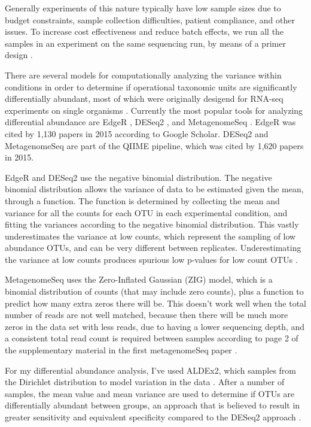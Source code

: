 Generally experiments of this nature typically have low sample sizes due to budget constraints, sample collection difficulties, patient compliance, and other issues. To increase cost effectiveness and reduce batch effects, we run all the samples in an experiment on the same sequencing run, by means of a primer design \cite{gloor2010microbiome}.

There are several models for computationally analyzing the variance within conditions in order to determine if operational taxonomic units are significantly differentially abundant, most of which were originally desigend for RNA-seq experiments on single organisms \cite{pachter2011models}. Currently the most popular tools for analyzing differential abundance are EdgeR \cite{robinson2010edger}, DESeq2 \cite{love2014moderated}, and MetagenomeSeq \cite{paulson2014metagenomeseq}. EdgeR was cited by 1,130 papers in 2015 according to Google Scholar. DESeq2 and MetagenomeSeq are part of the QIIME pipeline, which was cited by 1,620 papers in 2015.

EdgeR and DESeq2 use the negative binomial distribution. The negative binomial distribution allows the variance of data to be estimated given the mean, through a function. The function is determined by collecting the mean and variance for all the counts for each OTU in each experimental condition, and fitting the variances according to the negative binomial distribution. This vastly underestimates the variance at low counts, which represent the sampling of low abundance OTUs, and can be very different between replicates. Underestimating the variance at low counts produces spurious low p-values for low count OTUs \cite{fernandes2013anova}.

MetagenomeSeq uses the Zero-Inflated Gaussian (ZIG) model, which is a binomial distribution of counts (that may include zero counts), plus a function to predict how many extra zeros there will be. This doesn’t work well when the total number of reads are not well matched, because then there will be much more zeros in the data set with less reads, due to having a lower sequencing depth, and a consistent total read count is required between samples according to page 2 of the supplementary material in the first metagenomeSeq paper \cite{paulson2014metagenomeseq}.

For my differential abundance analysis, I’ve used ALDEx2, which samples from the Dirichlet distribution to model variation in the data \cite{fernandes2014unifying}. After a number of samples, the mean value and mean variance are used to determine if OTUs are differentially abundant between groups, an approach that is believed to result in greater sensitivity and equivalent specificity compared to the DESeq2 approach \cite{fernandes2014unifying}.

